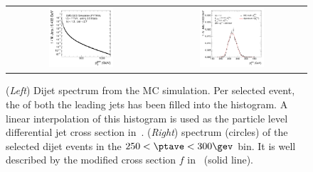 \begin{figure}[ht]
  \label{fig:ResFit:Asym:Spectrum}
  \centering
  \begin{tabular}{cc}
    \includegraphics[width=0.45\textwidth]{figures/ExampleSpectrum} &
    \includegraphics[width=0.45\textwidth]{figures/MaxLike_Eta00-13_SpectrumJet1_PtBin7}\\
 \end{tabular}
  \caption{(\textit{Left}) Dijet \ptgen spectrum from the MC simulation.
    Per selected event, the \ptgen of both the leading jets has been filled into the histogram.
    A linear interpolation of this histogram is used as the particle level differential jet cross section in~.
    (\textit{Right}) \ptgen spectrum (circles) of the selected dijet events in the \mbox{$250 < \ptave < 300\gev$} bin.
    It is well described by the modified cross section $f$ in~ (solid line).}
\end{figure}

